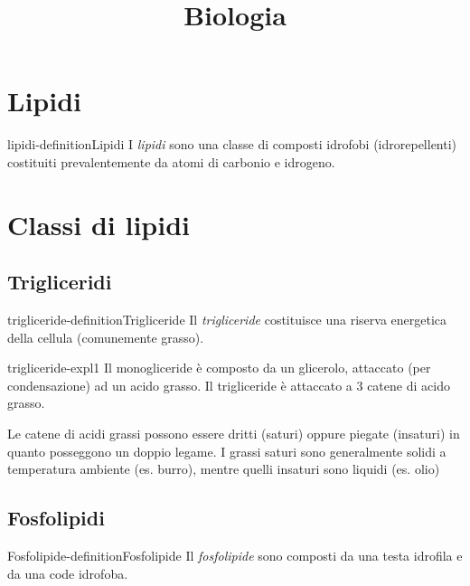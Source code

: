 \documentclass[preview]{standalone}
\begin{document}
\title{Biologia}
\genpage

\section{Lipidi}

\begin{snippetdefinition}{lipidi-definition}{Lipidi}
    I \textit{lipidi} sono una classe di composti idrofobi (idrorepellenti)
    costituiti prevalentemente da atomi di carbonio e idrogeno.
\end{snippetdefinition}


\section{Classi di lipidi}

\subsection{Trigliceridi}

\begin{snippetdefinition}{trigliceride-definition}{Trigliceride}
    Il \textit{trigliceride} costituisce una riserva energetica della cellula (comunemente grasso).
\end{snippetdefinition}

\begin{snippet}{trigliceride-expl1}
    Il monogliceride è composto da un glicerolo, attaccato (per condensazione) ad un acido grasso.
    Il trigliceride è attaccato a 3 catene di acido grasso.

    Le catene di acidi grassi possono essere dritti (saturi) oppure piegate (insaturi)
    in quanto posseggono un doppio legame.
    I grassi saturi sono generalmente solidi a temperatura ambiente (es. burro),
    mentre quelli insaturi sono liquidi (es. olio)
\end{snippet}


\subsection{Fosfolipidi}

\begin{snippetdefinition}{Fosfolipide-definition}{Fosfolipide}
    Il \textit{fosfolipide} sono composti da una testa idrofila e da una code idrofoba.
\end{snippetdefinition}
\end{document}

